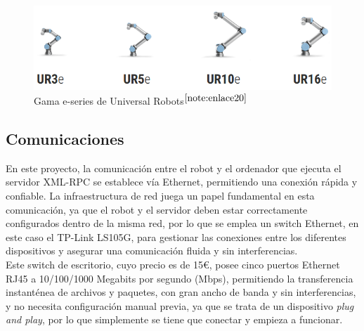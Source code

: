 \begin{figure} [H]
    \begin{center}
      \includegraphics[width=15cm]{figs/Gama e-series.png}
    \end{center}
    \caption{Gama e-series de Universal Robots$^{\ref{note:enlace20}}$}
    \label{fig:Gama_e-series}
\end{figure}

\setcounter{footnote}{20} 


\subsection{Comunicaciones}
\label{subsec:comunicacion}

En este proyecto, la comunicación entre el robot y el ordenador que ejecuta el servidor XML-RPC se establece vía Ethernet, permitiendo una conexión rápida y confiable. La infraestructura de red juega un papel fundamental en esta comunicación, ya que el robot y el servidor deben estar correctamente configurados dentro de la misma red, por lo que se emplea un switch Ethernet, en este caso el TP-Link LS105G, %
para gestionar las conexiones entre los diferentes dispositivos y asegurar una comunicación fluida y sin interferencias.\\

Este switch de escritorio, cuyo precio es de 15€,  posee cinco puertos Ethernet RJ45 a 10/100/1000 Megabits por segundo (Mbps), permitiendo la transferencia instanténea de archivos y paquetes, con gran ancho de banda y sin interferencias, y no necesita configuración manual previa, ya que se trata de un dispositivo \emph{plug and play}, por lo que simplemente se tiene que conectar y empieza a funcionar. 


